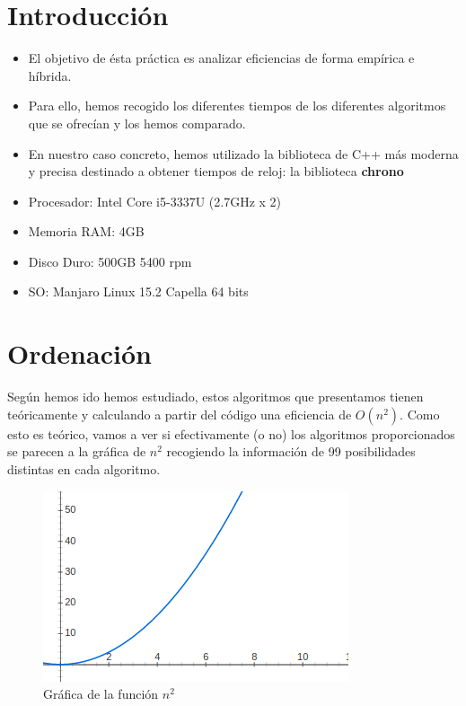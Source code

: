 \section{Introducción }
\begin{frame}
	
	\begin{itemize}
		\item El objetivo de ésta práctica es analizar eficiencias de forma empírica e híbrida.
		\item Para ello, hemos recogido los diferentes tiempos de los diferentes algoritmos que se ofrecían y los hemos comparado.
		\item En nuestro caso concreto, hemos utilizado la biblioteca de C++ más moderna y precisa destinado a obtener tiempos de reloj: la biblioteca \textbf{chrono}
	\end{itemize}
\end{frame}
\begin{frame}
	
	\begin{itemize}
		
		\item Procesador: Intel Core i5-3337U (2.7GHz x 2)
		\item Memoria RAM: 4GB
		\item Disco Duro: 500GB 5400 rpm
		\item SO: Manjaro Linux 15.2 Capella 64 bits
	\end{itemize}
	
\end{frame}


\section{Ordenación} %


Según hemos ido hemos estudiado, estos algoritmos que presentamos tienen teóricamente y calculando a partir del código una eficiencia de $O(n^2 )$. Como esto es teórico, vamos a ver si efectivamente (o no) los algoritmos proporcionados se parecen a la gráfica de $n^2$ recogiendo la información de 99 posibilidades distintas en cada algoritmo.
\begin{figure}[H]
	\centering
	\includegraphics[scale=0.5]{imagenes/enecuadrado.png}
	\caption{Gráfica de la función $n^2$}
	\label{fig:E1}
\end{figure}



